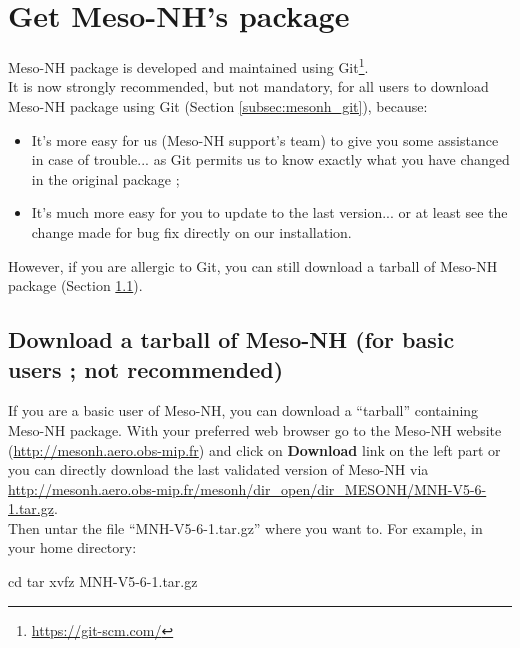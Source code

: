 \section{Get Meso-NH's package}
\label{sec:get_mesonh_package}

Meso-NH package is developed and maintained using Git\footnote{\href{https://git-scm.com/}{https://git-scm.com/}}. \\

It is now strongly recommended, but not mandatory, for all users to download Meso-NH package using Git (Section \ref{subsec:mesonh_git}), because:
\begin{itemize}
\item It's more easy for us (Meso-NH support's team) to give you some assistance in case of trouble... as Git permits us to know exactly what you have changed in the original package ;
\item It's much more easy for you to update to the last version...  or at least see the change made for bug fix directly on our installation.
\end{itemize}

However, if you are allergic to Git, you can still download a tarball of Meso-NH package (Section \ref{subsec:mesonh_tar}).

\subsection{Download a tarball of Meso-NH (for basic users ; not recommended)}
\label{subsec:mesonh_tar}

If you are a basic user of Meso-NH, you can download a ``tarball'' containing Meso-NH package. With your preferred web browser go to the Meso-NH website (\href{http://mesonh.aero.obs-mip.fr/mesonh}{http://mesonh.aero.obs-mip.fr}) and click on \textbf{Download} link on the left part or you can directly download the last validated version of Meso-NH via \href{http://mesonh.aero.obs-mip.fr/mesonh/dir_open/dir_MESONH/MNH-V5-6-1.tar.gz}{http://mesonh.aero.obs-mip.fr/mesonh/dir\_open/dir\_MESONH/MNH-V5-6-1.tar.gz}. \\

Then untar the file ``MNH-V5-6-1.tar.gz'' where you want to.
For example, in your home directory:
\begin{bashcode}
cd
tar xvfz MNH-V5-6-1.tar.gz
\end{bashcode}

